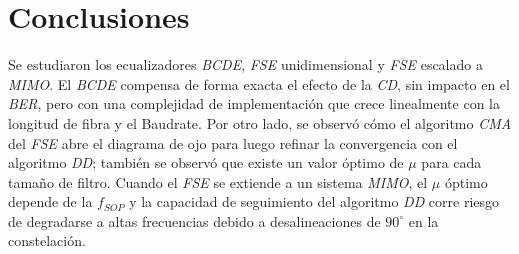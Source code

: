 \documentclass[12pt,a4paper]{article}
\begin{document}
\section{Conclusiones}                                              \label{sec_3}
Se estudiaron los ecualizadores \textit{BCDE}, \textit{FSE} unidimensional y \textit{FSE} escalado a \textit{MIMO}. El \textit{BCDE} compensa de forma exacta el efecto de la \textit{CD}, sin impacto en el \textit{BER}, pero con una complejidad de implementación que crece linealmente con la longitud de fibra y el Baudrate. Por otro lado, se observó cómo el algoritmo \textit{CMA} del \textit{FSE} abre el diagrama de ojo para luego refinar la convergencia con el algoritmo \textit{DD}; también se observó que existe un valor óptimo de $\mu$ para cada tamaño de filtro. Cuando el \textit{FSE} se extiende a un sistema \textit{MIMO}, el $\mu$ óptimo depende de la $f_{SOP}$ y la capacidad de seguimiento del algoritmo \textit{DD} corre riesgo de degradarse a altas frecuencias debido a desalineaciones de $90^\circ$ en la constelación.

\newpage
\printbibliography[heading=bibintoc, title={4. \ Referencias}]
\end{document}
